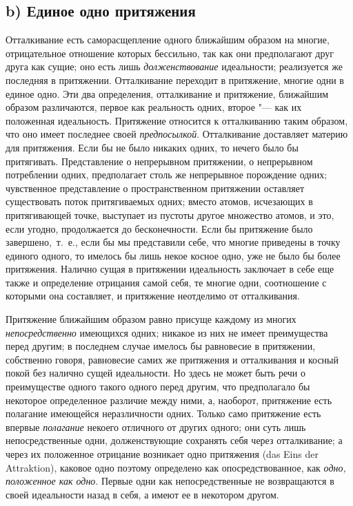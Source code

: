 \subsection*{b) Единое одно притяжения}
Отталкивание есть саморасщепление одного ближайшим образом на многие,
отрицательное отношение которых бессильно, так как они предполагают друг
друга как сущие; оно есть лишь {\em долженствование}
идеальности; реализуется же последняя в притяжении. Отталкивание переходит
в притяжение, многие одни в единое одно. Эти два определения, отталкивание
и притяжение, ближайшим образом различаются, первое как реальность одних,
второе "--- как их положенная идеальность. Притяжение относится к отталкиванию
таким образом, что оно имеет последнее своей
{\em предпосылкой}. Отталкивание доставляет материю для
притяжения. Если бы не было никаких одних, то нечего было бы притягивать.
Представление о непрерывном притяжении, о непрерывном потреблении одних,
предполагает столь же непрерывное порождение одних; чувственное
представление о пространственном притяжении оставляет существовать поток
притягиваемых одних; вместо атомов, исчезающих в притягивающей точке,
выступает из пустоты другое множество атомов, и это, если угодно,
продолжается до бесконечности. Если бы притяжение было завершено,~т.~е.,
если бы мы представили себе, что многие приведены в точку единого одного,
то имелось бы лишь некое косное одно, уже не было бы более притяжения.
Налично сущая в притяжении идеальность заключает в себе еще также и
определение отрицания самой себя, те многие одни, соотношение с которыми
она составляет, и притяжение неотделимо от отталкивания.

Притяжение ближайшим образом равно присуще каждому из многих
{\em непосредственно} имеющихся одних; никакое из них
не имеет преимущества перед другим; в последнем случае имелось бы
равновесие в притяжении, собственно говоря, равновесие самих же притяжения
и отталкивания и косный покой без налично сущей идеальности. Но здесь не
может быть речи о преимуществе одного такого одного перед другим, что
предполагало бы некоторое определенное различие между ними, а, наоборот,
притяжение есть полагание имеющейся неразличности одних. Только само
притяжение есть впервые {\em полагание} некоего
отличного от других одного; они суть лишь непосредственные одни,
долженствующие сохранять себя через отталкивание; а через их положенное
отрицание возникает одно притяжения (das Eins der Attraktion), каковое одно
поэтому определено как опосредствованное, как
{\em одно, положенное как одно}. Первые одни как
непосредственные не возвращаются в своей идеальности назад в себя, а имеют
ее в некотором другом.

